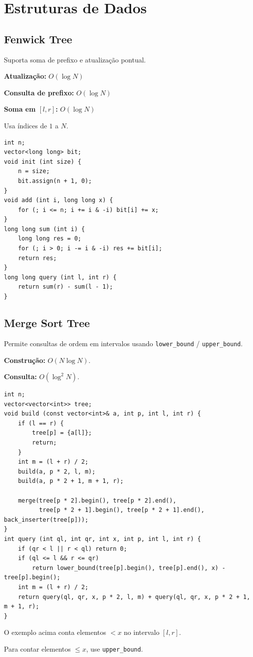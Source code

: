 \section{Estruturas de Dados}

\subsection{Fenwick Tree}

Suporta soma de prefixo e atualização pontual.

\textbf{Atualização:} $O(\log N)$

\textbf{Consulta de prefixo:} $O(\log N)$

\textbf{Soma em $[l,r]$:} $O(\log N)$

Usa índices de $1$ a $N$.

\begin{lstlisting}
int n;
vector<long long> bit;
void init (int size) {
    n = size;
    bit.assign(n + 1, 0);
}
void add (int i, long long x) {
    for (; i <= n; i += i & -i) bit[i] += x;
}
long long sum (int i) {
    long long res = 0;
    for (; i > 0; i -= i & -i) res += bit[i];
    return res;
}
long long query (int l, int r) {
    return sum(r) - sum(l - 1);
}
\end{lstlisting}



\subsection{Merge Sort Tree}

Permite consultas de ordem em intervalos usando
\texttt{lower\_bound} / \texttt{upper\_bound}.

\textbf{Construção:} $O(N\log N)$.

\textbf{Consulta:} $O(\log^2 N)$.

\begin{lstlisting}
int n;
vector<vector<int>> tree;
void build (const vector<int>& a, int p, int l, int r) {
    if (l == r) {
        tree[p] = {a[l]};
        return;
    }
    int m = (l + r) / 2;
    build(a, p * 2, l, m);
    build(a, p * 2 + 1, m + 1, r);

    merge(tree[p * 2].begin(), tree[p * 2].end(), 
          tree[p * 2 + 1].begin(), tree[p * 2 + 1].end(), back_inserter(tree[p]));
}
int query (int ql, int qr, int x, int p, int l, int r) {
    if (qr < l || r < ql) return 0;
    if (ql <= l && r <= qr)
        return lower_bound(tree[p].begin(), tree[p].end(), x) - tree[p].begin();
    int m = (l + r) / 2;
    return query(ql, qr, x, p * 2, l, m) + query(ql, qr, x, p * 2 + 1, m + 1, r);
}
\end{lstlisting}

O exemplo acima conta elementos $<x$ no intervalo $[l,r]$.

Para contar elementos $\leq x$, use \texttt{upper\_bound}.